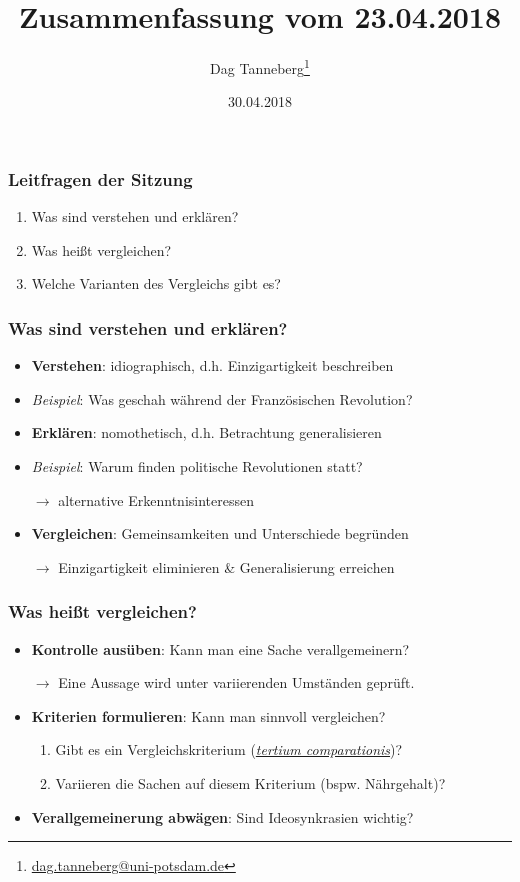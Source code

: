 \documentclass{beamer}
\title{Zusammenfassung vom 23.04.2018}
\author{Dag Tanneberg\thanks{%
  \href{mailto:dag.tanneberg@uni-potsdam.de}%
    {dag.tanneberg@uni-potsdam.de}
  }
}
\institute[Universität Potsdam]{
  {\glqq}Grundlagen der Vergleichenden Politikwissenschaft{\grqq}\\
  Universität Potsdam\\
  Lehrstuhl für Vergleichende Politikwissenschaft\\
  Sommersemester 2018
}
\date{30.04.2018}
\begin{document}
\maketitle

\begin{frame}
  \frametitle{Leitfragen der Sitzung}
  \begin{enumerate}
    \item Was sind verstehen und erklären?
    \item Was heißt vergleichen?
    \item Welche Varianten des Vergleichs gibt es?
  \end{enumerate}
\end{frame}

\begin{frame}
  \frametitle{Was sind verstehen und erklären?}
  \begin{itemize}
    \item \textbf{Verstehen}: idiographisch, d.h. Einzigartigkeit beschreiben
    \item \textit{Beispiel}: Was geschah während der Französischen Revolution?
    \item \textbf{Erklären}: nomothetisch, d.h. Betrachtung generalisieren
    \item \textit{Beispiel}: Warum finden politische Revolutionen statt?
    \item [$\rightarrow$] alternative Erkenntnisinteressen
    \item \textbf{Vergleichen}: Gemeinsamkeiten und Unterschiede begründen
    \item [$\rightarrow$] Einzigartigkeit eliminieren \& Generalisierung erreichen
  \end{itemize}
\end{frame}

\begin{frame}
  \frametitle{Was heißt vergleichen?}
  \begin{itemize}
    \item \textbf{Kontrolle ausüben}: Kann man eine Sache verallgemeinern?
    \item [$\rightarrow$] Eine Aussage wird unter variierenden Umständen geprüft.
    \item \textbf{Kriterien formulieren}: Kann man sinnvoll vergleichen?
    \begin{enumerate}
      \item Gibt es ein Vergleichskriterium (\href{https://de.wikipedia.org/wiki/Tertium_comparationis}{\textit{tertium comparationis}})?
      \item Variieren die Sachen auf diesem Kriterium (bspw. Nährgehalt)?
    \end{enumerate}
    \item \textbf{Verallgemeinerung abwägen}: Sind Ideosynkrasien wichtig?
  \end{itemize}
\end{frame}
\end{document}
